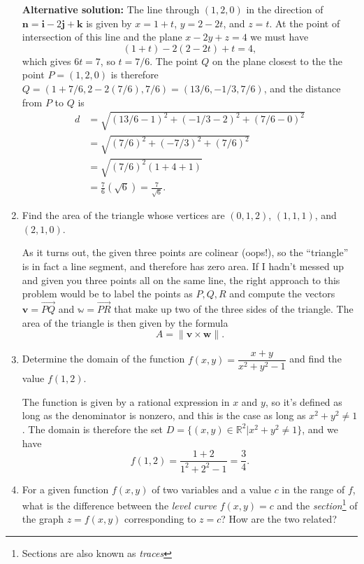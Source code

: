\documentclass[letterpaper,12pt]{article}
\newcommand{\R}{\mathbb{R}}
\renewcommand{\i}{\mathbf{i}}
\renewcommand{\j}{\mathbf{j}}
\renewcommand{\k}{\mathbf{k}}
\newcommand{\len}[1]{\lVert #1\rVert}
\begin{document}
\begin{enumerate}
\bigskip

{\bf Alternative solution:} The line through $(1,2,0)$ in the direction of $\mathbf{n} = \i-2\j+\k$ is given by $x=1+t$, $y=2-2t$, and $z=t$. At the point of intersection of this line and the plane $x-2y+z=4$ we must have 
\[
 (1+t)-2(2-2t)+t=4,
\]
which gives $6t=7$, so $t=7/6$. The point $Q$ on the plane closest to the the point $P=(1,2,0)$ is therefore $Q=(1+7/6,2-2(7/6),7/6) = (13/6, -1/3, 7/6)$, and the distance from $P$ to $Q$ is
\begin{align*}
 d &= \sqrt{(13/6-1)^2+(-1/3-2)^2+(7/6-0)^2}\\& = \sqrt{(7/6)^2+(-7/3)^2+(7/6)^2}\\& = \sqrt{(7/6)^2(1+4+1)}\\& = \frac{7}{6}(\sqrt{6})= \frac{7}{\sqrt{6}}.
\end{align*}




 \item Find the area of the triangle whose vertices are $(0,1,2)$, $(1,1,1)$, and $(2,1,0)$.

\bigskip

As it turns out, the given three points are colinear (oops!), so the ``triangle'' is in fact a line segment, and therefore has zero area. If I hadn't messed up and given you three points all on the same line, the right approach to this problem would be to label the points as $P,Q,R$ and compute the vectors $\mathbf{v} = \overrightarrow{PQ}$ and $\mathbb{w} = \overrightarrow{PR}$ that make up two of the three sides of the triangle. The area of the triangle is then given by the formula
\[
 A = \len{\mathbf{v}\times\mathbf{w}}.
\]

 \item Determine the domain of the function $f(x,y) = \dfrac{x+y}{x^2+y^2-1}$ and find the value $f(1,2)$.

\bigskip

The function is given by a rational expression in $x$ and $y$, so it's defined as long as the denominator is nonzero, and this is the case as long as $x^2+y^2\neq 1$. The domain is therefore the set $D = \{(x,y)\in\R^2 | x^2+y^2\neq 1\}$, and we have
\[
 f(1,2) = \frac{1+2}{1^2+2^2-1} = \frac{3}{4}.
\]

 \item For a given function $f(x,y)$ of two variables and a value $c$ in the range of $f$, what is the difference between the {\em level curve} $f(x,y)=c$ and the {\em section}\footnote{Sections are also known as {\em traces}} of the graph $z=f(x,y)$ corresponding to $z=c$? How are the two related?


\end{enumerate}
\end{document}
